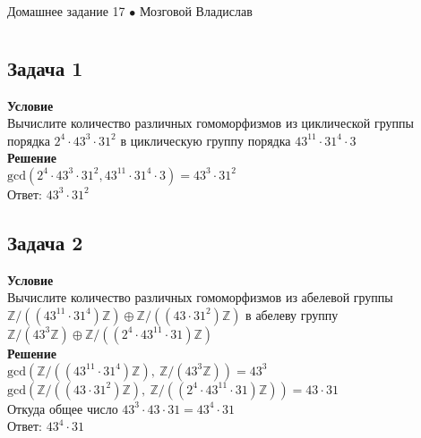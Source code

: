 \newpage
	{\large \hspace{3cm} \begin{center} Домашнее задание 17 $\bullet$ Мозговой Владислав \end{center} }
	\vspace{-1.5ex}
	\hrulefill
	
	\fontsize{12pt}{4.5mm}\selectfont
	\vspace{-3ex}
	\hrulefill
	\newline

	\section{}
		\subsection*{\textbf{Задача 1}}
		\textbf{Условие}\\
		Вычислите количество различных гомоморфизмов из циклической группы порядка $2^{4} \cdot 43^{3} \cdot 31^{2}$ в циклическую группу порядка $43^{11} \cdot 31^{4} \cdot 3$
		\\
		\textbf{Решение}\\
		$\text{gcd}(2^{4} \cdot 43^{3} \cdot 31^{2}, 43^{11} \cdot 31^{4} \cdot 3) = 43^{3} \cdot 31^{2}$\\
		Ответ: $43^{3} \cdot 31^{2}$
		
		\subsection*{\textbf{Задача 2}}
		\textbf{Условие}\\
		Вычислите количество различных гомоморфизмов из абелевой группы $\mathbb{Z} /\left(\left(43^{11} \cdot 31^{4}\right) \mathbb{Z}\right) \oplus \mathbb{Z} /\left(\left(43 \cdot 31^{2}\right) \mathbb{Z}\right)$ в абелеву группу $\mathbb{Z} /\left(43^{3} \mathbb{Z}\right) \oplus \mathbb{Z} /\left(\left(2^{4} \cdot 43^{11} \cdot 31\right) \mathbb{Z}\right)$
		\\
		\textbf{Решение}\\
		$\text{gcd}(\mathbb{Z} /\left(\left(43^{11} \cdot 31^{4}\right) \mathbb{Z}\right),\ \mathbb{Z} /\left(43^{3} \mathbb{Z}\right)) = 43^{3}$\\
		$\text{gcd}(\mathbb{Z} /\left(\left(43 \cdot 31^{2}\right) \mathbb{Z}\right),\ \mathbb{Z} /\left(\left(2^{4} \cdot 43^{11} \cdot 31\right) \mathbb{Z}\right)) = 43 \cdot 31$\\
		Откуда общее число $43^{3} \cdot 43 \cdot 31 = 43^{4} \cdot 31$\\
		Ответ: $43^{4} \cdot 31$
		
